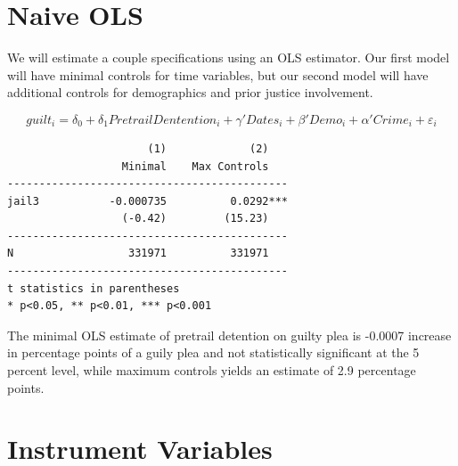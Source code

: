 \documentclass[
]{book}
\newenvironment{Shaded}{\begin{snugshade}}{\end{snugshade}}
\newcommand{\KeywordTok}[1]{\textcolor[rgb]{0.13,0.29,0.53}{\textbf{#1}}}
\newcommand{\NormalTok}[1]{#1}
\newcommand{\OtherTok}[1]{\textcolor[rgb]{0.56,0.35,0.01}{#1}}
\newcommand{\StringTok}[1]{\textcolor[rgb]{0.31,0.60,0.02}{#1}}
\begin{document}
\section{Naive OLS}\label{naive-ols-1}

We will estimate a couple specifications using an OLS estimator. Our first model will have minimal controls for time variables, but our second model will have additional controls for demographics and prior justice involvement.

\[ guilt_i = \delta_0 +\delta_1 PretrailDentention_i + \gamma'Dates_i + \beta'Demo_i + \alpha'Crime_i + \varepsilon_i \]

\begin{Shaded}
\end{Shaded}

\begin{verbatim}
                      (1)             (2)   
                  Minimal    Max Controls   
--------------------------------------------
jail3           -0.000735          0.0292***
                  (-0.42)         (15.23)   
--------------------------------------------
N                  331971          331971   
--------------------------------------------
t statistics in parentheses
* p<0.05, ** p<0.01, *** p<0.001
\end{verbatim}

The minimal OLS estimate of pretrail detention on guilty plea is -0.0007 increase in percentage points of a guily plea and not statistically significant at the 5 percent level, while maximum controls yields an estimate of 2.9 percentage points.

\section{Instrument Variables}\label{instrument-variables}
\end{document}
